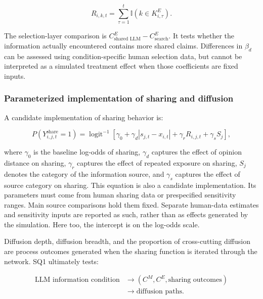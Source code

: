 \documentclass[11pt,a4paper]{article}
\begin{document}
\begin{equation*}
R_{i,k,t}
=
\sum_{\tau=1}^{t}
\mathbb I(k\in K^{E}_{i,\tau}).
\end{equation*}

The selection-layer comparison is $C^{E}_{\text{shared LLM}}-C^{E}_{\text{search}}$. It tests whether the information actually encountered contains more shared claims. Differences in $\beta_d$ can be assessed using condition-specific human selection data, but cannot be interpreted as a simulated treatment effect when those coefficients are fixed inputs.

\subsubsection{Parameterized implementation of sharing and diffusion}

A candidate implementation of sharing behavior is:

\begin{equation*}
P(Y_{i,j,t}^{\text{share}}=1)
=
\operatorname{logit}^{-1}
\left[
\gamma_0
+
\gamma_d|s_{j,t}-x_{i,t}|
+
\gamma_rR_{i,j,t}
+
\gamma_sS_j
\right],
\end{equation*}

where $\gamma_0$ is the baseline log-odds of sharing, $\gamma_d$ captures the effect of opinion distance on sharing, $\gamma_r$ captures the effect of repeated exposure on sharing, $S_j$ denotes the category of the information source, and $\gamma_s$ captures the effect of source category on sharing. This equation is also a candidate implementation. Its parameters must come from human sharing data or prespecified sensitivity ranges. Main source comparisons hold them fixed. Separate human-data estimates and sensitivity inputs are reported as such, rather than as effects generated by the simulation. Here too, the intercept is on the log-odds scale.

Diffusion depth, diffusion breadth, and the proportion of cross-cutting diffusion are process outcomes generated when the sharing function is iterated through the network. SQ1 ultimately tests:

\begin{equation*}
\begin{aligned}\text{LLM information condition} &\rightarrow \left( C^{M},C^{E},\text{sharing outcomes} \right) \\
&\rightarrow \text{diffusion paths}.\end{aligned}
\end{equation*}
\end{document}
